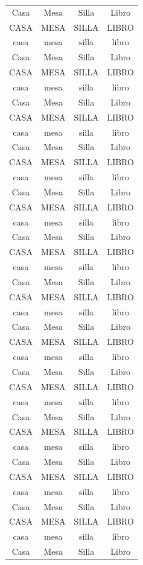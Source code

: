 \documentclass{report}
\begin{document}
\begin{longtable}[c]{c|c|c|c}
	Casa & Mesa & Silla & Libro \\
	CASA & MESA & SILLA & LIBRO \\	
	casa & mesa & silla & libro \\
	Casa & Mesa & Silla & Libro \\
	CASA & MESA & SILLA & LIBRO \\
	casa & mesa & silla & libro \\
	Casa & Mesa & Silla & Libro \\
	CASA & MESA & SILLA & LIBRO \\
	casa & mesa & silla & libro \\
	Casa & Mesa & Silla & Libro \\
	CASA & MESA & SILLA & LIBRO \\
	casa & mesa & silla & libro \\
	Casa & Mesa & Silla & Libro \\
	CASA & MESA & SILLA & LIBRO \\
	casa & mesa & silla & libro \\
	Casa & Mesa & Silla & Libro \\
	CASA & MESA & SILLA & LIBRO \\
	casa & mesa & silla & libro \\
	Casa & Mesa & Silla & Libro \\
	CASA & MESA & SILLA & LIBRO \\
	casa & mesa & silla & libro \\
	Casa & Mesa & Silla & Libro \\
	CASA & MESA & SILLA & LIBRO \\
	casa & mesa & silla & libro \\
	Casa & Mesa & Silla & Libro \\
	CASA & MESA & SILLA & LIBRO \\
	casa & mesa & silla & libro \\
	Casa & Mesa & Silla & Libro \\
	CASA & MESA & SILLA & LIBRO \\
	casa & mesa & silla & libro \\
	Casa & Mesa & Silla & Libro \\
	CASA & MESA & SILLA & LIBRO \\
	casa & mesa & silla & libro \\
	Casa & Mesa & Silla & Libro \\
	CASA & MESA & SILLA & LIBRO \\
	casa & mesa & silla & libro \\
	Casa & Mesa & Silla & Libro \\

\end{longtable}
\end{document}
